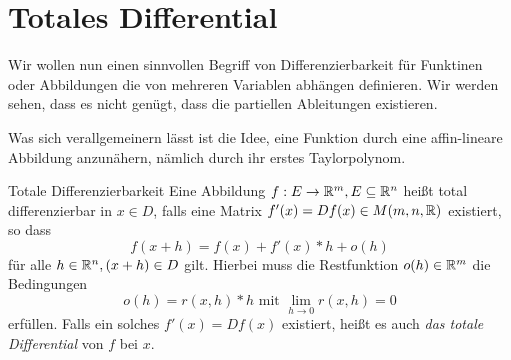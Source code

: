 \section{Totales Differential}
Wir wollen nun einen sinnvollen Begriff von Differenzierbarkeit für Funktinen oder Abbildungen die von mehreren Variablen abhängen definieren. Wir werden sehen, dass es nicht genügt, dass die partiellen Ableitungen existieren.

Was sich verallgemeinern lässt ist die Idee, eine Funktion durch eine affin-lineare Abbildung anzunähern, nämlich durch ihr erstes Taylorpolynom.

\begin{definition}{Totale Differenzierbarkeit}
	Eine Abbildung $f:E\rightarrow\mathbb{R}^m,E\subseteq \mathbb{R}^n$ heißt total differenzierbar in $x\in D$, falls eine Matrix $f'(x)=Df(x)\in M(m,n,\mathbb{R})$ existiert, so dass
	\begin{equation*}
		f(x+h)=f(x)+f'(x)*h+o(h)
	\end{equation*}
	für alle $h\in\mathbb{R}^n, (x+h)\in D$ gilt. Hierbei muss die Restfunktion $o(h)\in\mathbb{R}^m$ die Bedingungen
	\begin{equation*}
		o(h)=r(x,h)*h\text{ mit }\lim\limits_{h\to 0} r(x,h)=0
	\end{equation*}
	erfüllen. Falls ein solches $f'(x)=Df(x)$ existiert, heißt es auch \emph{das totale Differential} von $f$ bei $x$.
\end{definition}

